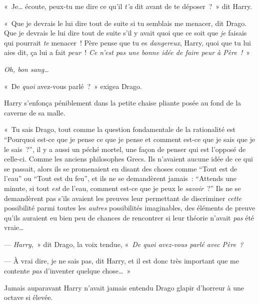«~Je… écoute, peux-tu me dire ce qu'il \emph{t'a} dit avant de te déposer~?~» dit Harry.

«~Que je devrais le lui dire tout de suite si tu semblais me menacer, dit Drago. Que je devrais le lui dire tout de suite s'il y avait quoi que ce soit que \emph{je} faisais qui pourrait \emph{te} menacer~! Père pense que tu es \emph{dangereux}, Harry, quoi que tu lui aies dit, ça lui a fait \emph{peur}~! \emph{Ce n'est pas une bonne idée de faire peur à Père~!}~»

\emph{Oh, bon sang…}

«~De \emph{quoi} avez-vous parlé~?~» exigea Drago.

Harry s'enfonça péniblement dans la petite chaise pliante posée au fond de la caverne de sa malle.

«~Tu sais Drago, tout comme la question fondamentale de la rationalité est “Pourquoi est-ce que je pense ce que je pense et comment est-ce que je sais que je le sais~?”, il y a aussi un péché mortel, une façon de penser qui est l'opposé de celle-ci. Comme les anciens philosophes Grecs. Ils n'avaient aucune idée de ce qui se passait, alors ils se promenaient en disant des choses comme “Tout est de l'eau” ou “Tout est du feu”, et ils ne se demandèrent jamais~: “Attends une minute, si tout \emph{est} de l'eau, comment est-ce que je peux le \emph{savoir}~?” Ils ne se demandèrent pas s'ils avaient les preuves leur permettant de discriminer \emph{cette} possibilité parmi toutes les \emph{autres} possibilités imaginables, des éléments de preuve qu'ils auraient eu bien peu de chances de rencontrer si leur théorie n'avait \emph{pas} été vraie…

--- \emph{Harry,}~» dit Drago, la voix tendue, «~\emph{De quoi avez-vous parlé avec Père~?}

--- À vrai dire, je ne sais pas, dit Harry, et il est donc très important que me contente \emph{pas} d'inventer quelque chose…~»

Jamais auparavant Harry n'avait jamais entendu Drago glapir d'horreur à une octave si élevée.
